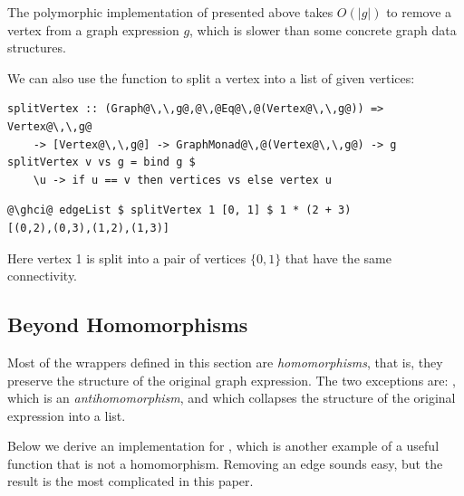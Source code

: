 The polymorphic implementation of  presented above takes
$O(|g|)$ to remove a vertex from a graph expression $g$, which is
slower than some concrete graph data structures.

We can also use the  function to split a vertex into a list of given vertices:

\begin{verbatim}
splitVertex :: (Graph@\,\,g@,@\,@Eq@\,@(Vertex@\,\,g@)) => Vertex@\,\,g@
    -> [Vertex@\,\,g@] -> GraphMonad@\,@(Vertex@\,\,g@) -> g
splitVertex v vs g = bind g $
    \u -> if u == v then vertices vs else vertex u
\end{verbatim}
\vspace{1mm}
\begin{verbatim}
@\ghci@ edgeList $ splitVertex 1 [0, 1] $ 1 * (2 + 3)
[(0,2),(0,3),(1,2),(1,3)]
\end{verbatim}

\noindent
Here vertex 1 is split into a pair of vertices $\{0, 1\}$ that have the same connectivity.

\subsection{Beyond Homomorphisms}\label{sub-beyond}

Most of the  wrappers defined in this section are \emph{homomorphisms},
that is, they preserve the structure of the original graph expression. The two
exceptions are: , which is an \emph{antihomomorphism}, and
 which collapses the structure of the original expression into a list.

Below we derive an implementation for , which is another
example of a useful function that is not a homomorphism. Removing an edge sounds
easy, but the result is the most complicated  in this paper.

